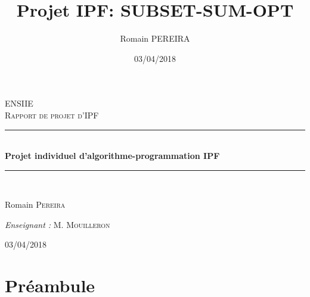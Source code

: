 \documentclass[10pt]{article}
\title{Projet IPF: SUBSET-SUM-OPT}
\author{Romain PEREIRA}
\date{03/04/2018}
\newcommand{\HRule}{\rule{\linewidth}{0.5mm}}
\begin{document}
	\begin{titlepage}
		\begin{sffamily}
			\begin{center}

				\textsc{\LARGE ENSIIE}\\[2cm]
				\textsc{\Large Rapport de projet d'IPF}\\[1.5cm]
				\HRule \\[0.4cm]
				{ \huge \bfseries Projet individuel d'algorithme-programmation IPF\\[0.4cm] }
				\HRule \\[2cm]

				\begin{minipage}{0.4\textwidth}
				\begin{flushleft} \large
					Romain \textsc{Pereira}\\
				\end{flushleft}
				\end{minipage}
				\begin{minipage}{0.4\textwidth}
				\begin{flushright} \large
					\emph{Enseignant :} M. \textsc{Mouilleron}\\
				\end{flushright}
				\end{minipage}

				\vfill
				{\large 03/04/2018}
			\end{center}
		\end{sffamily}
	\end{titlepage}

	\maketitle
	\tableofcontents

	\newpage
	\section{Préambule}
\end{document}
